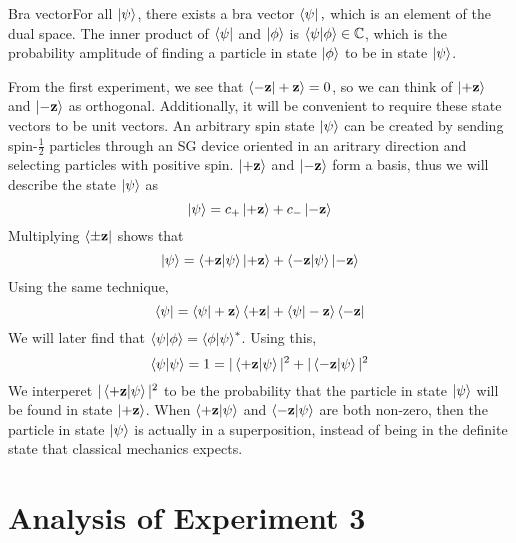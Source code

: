 \documentclass{report}
\newcommand{\dfn}[2]{\begin{Definition}[colbacktitle=red!75!black]{#1}{}#2\end{Definition}}
\begin{document}
\dfn{Bra vector}{For all \(\ket{\psi}\), there exists a bra vector \(\bra{\psi},\)
which is an element of the dual space. The inner product of 
\(\bra{\psi}\) and \(\ket{\phi}\) is  \(\braket{\psi|\phi} \in \mathbb C \), which is the probability amplitude of finding a particle in state \(\ket{\phi}\) to be in state \(\ket{\psi}\).}
From the first experiment, we see that \(\braket{- \mathbf z | + \mathbf z} = 0\), so we can think of \(\ket{+ \mathbf z}\) and \(\ket{- \mathbf z}\) as orthogonal. Additionally, it will be convenient to require these state vectors to be unit vectors. An arbitrary spin state \(\ket{\psi}\) can be created by sending spin-\(\frac{1}{2}\) particles through an SG device oriented in an aritrary direction and selecting particles with positive spin. \(\ket{+ \mathbf z}\) and \(\ket{- \mathbf z}\) form a basis, thus we will describe the state \(\ket{\psi}\) as
\[
\ket{\psi} = c_+ \ket{+ \mathbf z} + c_- \ket{- \mathbf z}
\] 
Multiplying \(\bra{ \pm \mathbf z} \) shows that
\[
\ket{\psi} = \braket{+ \mathbf z | \psi} \ket{+ \mathbf z} + \braket{- \mathbf z | \psi} \ket{- \mathbf z}
\] 
Using the same technique, 
\[
\bra{\psi} = \braket{\psi |+\mathbf z } \bra{+ \mathbf z} + \braket{ \psi | - \mathbf z } \bra{- \mathbf z}
\] 
We will later find that \(\braket{\psi | \phi} = \braket{\phi | \psi}^*\). Using this, 
\[
\braket{\psi | \psi} = 1 = |\braket{+ \mathbf z| \psi}|^2 + |\braket{- \mathbf z | \psi}|^2
\] 
We interperet \(|\braket{+ \mathbf z | \psi}|^2\) to be the probability that the particle in state \(\ket \psi\) will be found in state \(\ket{ + \mathbf z}\). When \(\braket{+ \mathbf z | \psi}\) and \(\braket{- \mathbf z | \psi}\) are both non-zero, then the particle in state \(\ket \psi\) is actually in a superposition, instead of being in the definite state that classical mechanics expects. 

\section{Analysis of Experiment 3}
\end{document}
